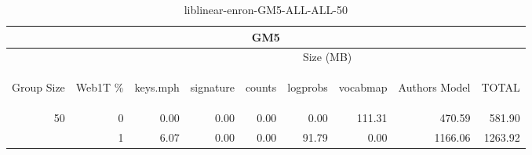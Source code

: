 \begin{center}
\begin{table}[htbp]
\begin{tabular}{ | r | r | r | r | r | r | r | r | r |}
\hline
\multicolumn{9}{|c|}{GM5}\\
\hline
 & & \multicolumn{7}{|c|}{Size (MB)}\\ \cline{3-9}
\begin{sideways}Group Size\end{sideways} & \begin{sideways}Web1T \% \end{sideways} & \begin{sideways}keys.mph\end{sideways} & \begin{sideways}signature\end{sideways} & \begin{sideways}counts\end{sideways} & \begin{sideways}logprobs\end{sideways} & \begin{sideways}vocabmap\end{sideways} & \begin{sideways}Authors Model \end{sideways} & \begin{sideways}TOTAL\end{sideways}\\
\hline
\multirow{1}{*}{50}
 & 0 & 0.00 & 0.00 & 0.00 & 0.00 & 111.31 & 470.59 & 581.90\\ \cline{2-9}
 & 1 & 6.07 & 0.00 & 0.00 & 91.79 & 0.00 & 1166.06 & 1263.92\\ \cline{2-9}
\hline
\end{tabular}
\caption{liblinear-enron-GM5-ALL-ALL-50}
\label{table:liblinear-enron-GM5-ALL-ALL-50}
\end{table}
\end{center}

